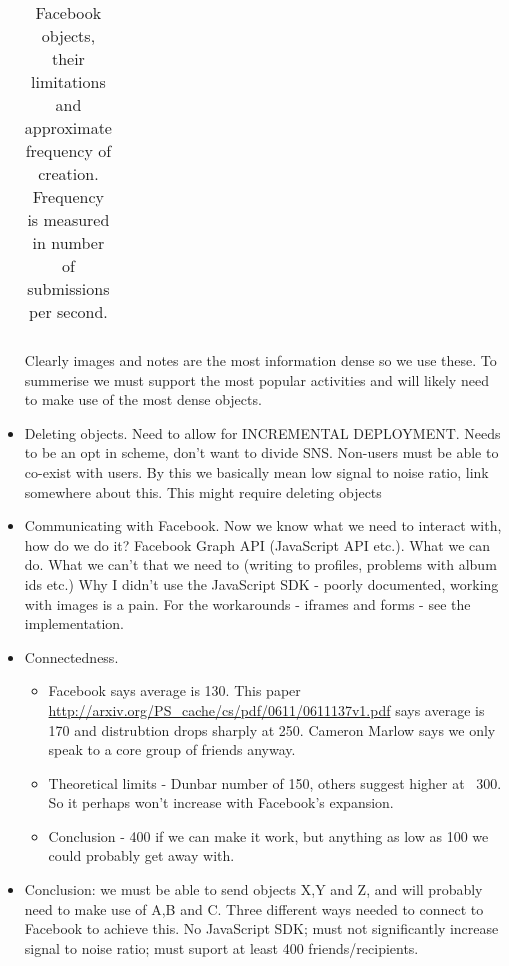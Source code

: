 \begin{itemize}
\begin{table}[h]
\begin{center}
\begin{tabular}{l l l l}
        \end{tabular}
        \caption{Facebook objects, their limitations and approximate frequency of creation. Frequency is measured in number of submissions per second.}
        \label{tab:fb-activities}
    \end{center}
\end{table}


    Clearly images and notes are the most information dense so we use these. To summerise we must support the most popular activities and will likely need to make use of the most dense objects.
    
    \item Deleting objects. Need to allow for INCREMENTAL DEPLOYMENT. Needs to be an opt in scheme, don't want to divide SNS. Non-users must be able to co-exist with users. By this we basically mean low signal to noise ratio, link somewhere about this. This might require deleting objects
    
    \item Communicating with Facebook. Now we know what we need to interact with, how do we do it? Facebook Graph API (JavaScript API etc.). What we can do. What we can't that we need to (writing to profiles, problems with album ids etc.) Why I didn't use the JavaScript SDK - poorly documented, working with images is a pain. For the workarounds - iframes and forms - see the implementation.
    
    \item Connectedness.
    \begin{itemize}
        \item Facebook says average is 130. This paper \url{http://arxiv.org/PS_cache/cs/pdf/0611/0611137v1.pdf} says average is 170 and distrubtion drops sharply at 250. Cameron Marlow says we only speak to a core group of friends anyway.
        \item Theoretical limits - Dunbar number of 150, others suggest higher at ~300. So it perhaps won't increase with Facebook's expansion.
        \item Conclusion - 400 if we can make it work, but anything as low as 100 we could probably get away with.
    \end{itemize}

    \item Conclusion: we must be able to send objects X,Y and Z, and will probably need to make use of A,B and C. Three different ways needed to connect to Facebook to achieve this. No JavaScript SDK; must not significantly increase signal to noise ratio; must suport at least 400 friends/recipients.

\end{itemize}
    
